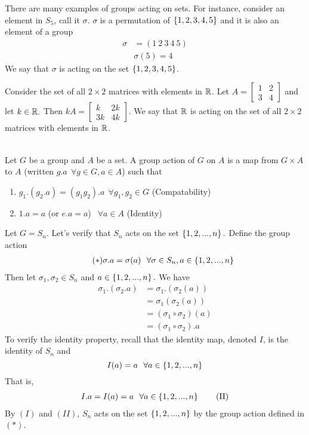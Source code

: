 There are many examples of groups acting on sets. For instance, consider an element in $S_5$, call it $\sigma.$ $\sigma$ is a permutation of $\left\{1,2,3,4,5\right\}$ and it is also an element of a group
\begin{align*}
    \sigma &= (1~2~3~4~5) \\
    &\sigma(5) = 4
\end{align*}
We say that $\sigma$ is acting on the set $\left\{1,2,3,4,5\right\}$.

Consider the set of all $2\times 2$ matrices with elements in $\mathbb{R}$. Let $A = \begin{bmatrix}
1 & 2 \\
3 & 4
\end{bmatrix}$ and let $k \in \mathbb{R}.$ Then $kA = \begin{bmatrix}
k & 2k \\
3k & 4k
\end{bmatrix}.$ We say that $\mathbb{R}$ is acting on the set of all $2\times 2$ matrices with elements in $\mathbb{R}$.

\begin{definition} \leavevmode \\
    Let $G$ be a group and $A$ be a set. A group action of $G$ on $A$ is a map from $G\times A$ to $A$ (written $g.a ~~\forall g \in G, a \in A$) such that
    \begin{enumerate}
        \item $g_1.(g_2.a) = (g_1g_2).a ~~\forall g_1, g_2 \in G$ (Compatability)
        \item $1.a = a$ (or $e.a = a$) $ ~~\forall a \in A$ (Identity)
    \end{enumerate}
\end{definition}

\begin{example}
    Let $G = S_n$. Let's verify that $S_n$ acts on the set $\left\{1,2,...,n\right\}.$ Define the group action
    \begin{align*} \tag{$*$}
        \sigma.a = \sigma(a) ~~\forall \sigma \in S_n, a \in \left\{1,2,...,n\right\}
    \end{align*}
    Then let $\sigma_1, \sigma_2 \in S_n$ and $a \in \left\{1,2,...,n\right\}.$ We have
    \begin{align*}
        \sigma_1.(\sigma_2.a) &= \sigma_1.(\sigma_2(a)) \\
        &= \sigma_1(\sigma_2(a)) \\
        &= (\sigma_1\circ\sigma_2)(a) \\
        &= (\sigma_1\circ\sigma_2).a \tag{I}
    \end{align*}
    To verify the identity property, recall that the identity map, denoted $I$, is the identity of $S_n$ and $$I(a) = a ~~\forall a \in \left\{1,2,...,n\right\}$$
    That is,
    \begin{align*}
        I.a = I(a) = a ~~\forall a \in \left\{1,2,...,n\right\} \tag{II}
    \end{align*}
    By $(I)$ and $(II)$, $S_n$ acts on the set $\left\{1,2,...,n\right\}$ by the group action defined in $(*)$.
\end{example}

